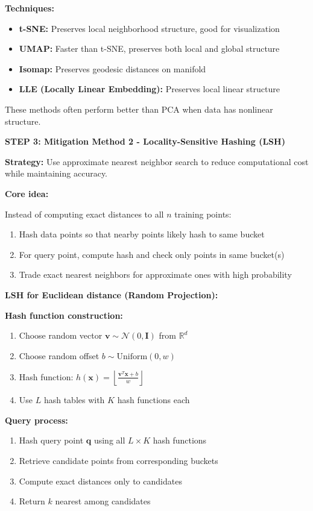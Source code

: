 \documentclass[12pt]{article}
\begin{document}
\begin{solution}
\textbf{Techniques:}
\begin{itemize}
    \item \textbf{t-SNE:} Preserves local neighborhood structure, good for visualization
    \item \textbf{UMAP:} Faster than t-SNE, preserves both local and global structure
    \item \textbf{Isomap:} Preserves geodesic distances on manifold
    \item \textbf{LLE (Locally Linear Embedding):} Preserves local linear structure
\end{itemize}

These methods often perform better than PCA when data has nonlinear structure.

\textbf{STEP 3: Mitigation Method 2 - Locality-Sensitive Hashing (LSH)}

\textbf{Strategy:} Use approximate nearest neighbor search to reduce computational cost while maintaining accuracy.

\textbf{Core idea:}

Instead of computing exact distances to all \(n\) training points:
\begin{enumerate}
    \item Hash data points so that nearby points likely hash to same bucket
    \item For query point, compute hash and check only points in same bucket(s)
    \item Trade exact nearest neighbors for approximate ones with high probability
\end{enumerate}

\textbf{LSH for Euclidean distance (Random Projection):}

\textbf{Hash function construction:}
\begin{enumerate}
    \item Choose random vector \(\mathbf{v} \sim \mathcal{N}(0, \mathbf{I})\) from \(\mathbb{R}^d\)
    \item Choose random offset \(b \sim \text{Uniform}(0, w)\)
    \item Hash function: \(h(\mathbf{x}) = \left\lfloor \frac{\mathbf{v}^T \mathbf{x} + b}{w} \right\rfloor\)
    \item Use \(L\) hash tables with \(K\) hash functions each
\end{enumerate}

\textbf{Query process:}
\begin{enumerate}
    \item Hash query point \(\mathbf{q}\) using all \(L \times K\) hash functions
    \item Retrieve candidate points from corresponding buckets
    \item Compute exact distances only to candidates
    \item Return \(k\) nearest among candidates
\end{enumerate}


\end{solution}
\end{document}
